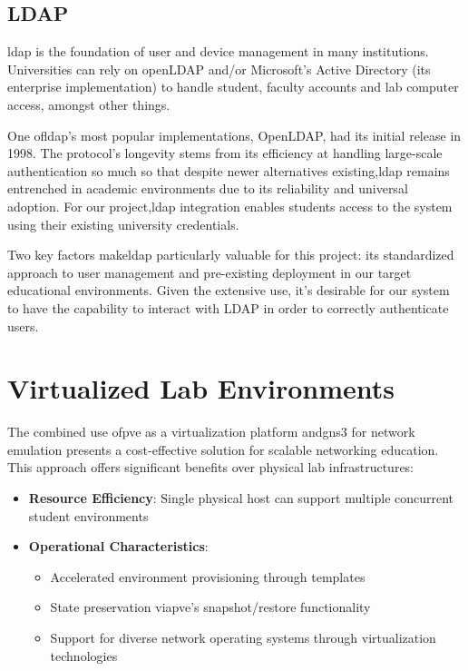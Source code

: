   \subsection{LDAP}

    \ac{ldap} is the foundation of user and device management in many institutions. Universities can rely on openLDAP and/or Microsoft's 
    Active Directory (its enterprise implementation) to handle student, faculty accounts and lab computer access, amongst other things.

    One of\ac{ldap}'s most popular implementations, OpenLDAP, had its initial release in 1998. The protocol's longevity stems from its 
    efficiency at handling large-scale authentication so much so that despite newer alternatives existing,\ac{ldap} remains entrenched 
    in academic environments due to its reliability and universal adoption. For our project,\ac{ldap} integration enables students 
    access to the system using their existing university credentials. 

    Two key factors make\ac{ldap} particularly valuable for this project: its standardized approach to user management 
    and pre-existing deployment in our target educational environments. Given the extensive use, it's desirable for our system to have the 
    capability to interact with LDAP in order to correctly authenticate users.

\section{Virtualized Lab Environments}
  The combined use of\ac{pve} as a virtualization platform and\ac{gns3} for network emulation presents a cost-effective solution for 
  scalable networking education. This approach offers significant benefits over physical lab infrastructures:

  \begin{itemize}
    \item \textbf{Resource Efficiency}: Single physical host can support multiple concurrent student environments
    \item \textbf{Operational Characteristics}:
    \begin{itemize}
        \item Accelerated environment provisioning through templates
        \item State preservation via\ac{pve}'s snapshot/restore functionality
        \item Support for diverse network operating systems through virtualization technologies
    \end{itemize}
  \end{itemize}

